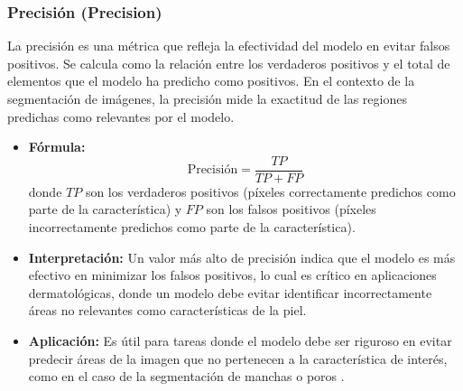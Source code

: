 \subsubsection{Precisión (Precision)}  
La precisión es una métrica que refleja la efectividad del modelo en evitar falsos positivos. Se calcula como la relación entre los verdaderos positivos y el total de elementos que el modelo ha predicho como positivos. En el contexto de la segmentación de imágenes, la precisión mide la exactitud de las regiones predichas como relevantes por el modelo.  
\begin{itemize}
    \item \textbf{Fórmula:}  
    \[
    \text{Precisión} = \frac{TP}{TP + FP}
    \]
    donde \( TP \) son los verdaderos positivos (píxeles correctamente predichos como parte de la característica) y \( FP \) son los falsos positivos (píxeles incorrectamente predichos como parte de la característica).
    \item \textbf{Interpretación:} Un valor más alto de precisión indica que el modelo es más efectivo en minimizar los falsos positivos, lo cual es crítico en aplicaciones dermatológicas, donde un modelo debe evitar identificar incorrectamente áreas no relevantes como características de la piel.
    \item \textbf{Aplicación:} Es útil para tareas donde el modelo debe ser riguroso en evitar predecir áreas de la imagen que no pertenecen a la característica de interés, como en el caso de la segmentación de manchas o poros \parencite{autor2019precision}.
\end{itemize}

